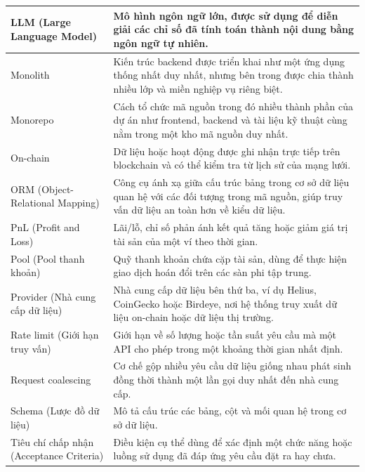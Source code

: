 \begin{longtable}{|L{3.8cm}|L{11.2cm}|}
LLM (Large Language Model) & Mô hình ngôn ngữ lớn, được sử dụng để diễn giải các chỉ số đã tính toán thành nội dung bằng ngôn ngữ tự nhiên. \\
\hline

Monolith & Kiến trúc backend được triển khai như một ứng dụng thống nhất duy nhất, nhưng bên trong được chia thành nhiều lớp và miền nghiệp vụ riêng biệt. \\
\hline

Monorepo & Cách tổ chức mã nguồn trong đó nhiều thành phần của dự án như frontend, backend và tài liệu kỹ thuật cùng nằm trong một kho mã nguồn duy nhất. \\
\hline

On-chain & Dữ liệu hoặc hoạt động được ghi nhận trực tiếp trên blockchain và có thể kiểm tra từ lịch sử của mạng lưới. \\
\hline

ORM (Object-Relational Mapping) & Công cụ ánh xạ giữa cấu trúc bảng trong cơ sở dữ liệu quan hệ với các đối tượng trong mã nguồn, giúp truy vấn dữ liệu an toàn hơn về kiểu dữ liệu. \\
\hline

PnL (Profit and Loss) & Lãi/lỗ, chỉ số phản ánh kết quả tăng hoặc giảm giá trị tài sản của một ví theo thời gian. \\
\hline

Pool (Pool thanh khoản) & Quỹ thanh khoản chứa cặp tài sản, dùng để thực hiện giao dịch hoán đổi trên các sàn phi tập trung. \\
\hline

Provider (Nhà cung cấp dữ liệu) & Nhà cung cấp dữ liệu bên thứ ba, ví dụ Helius, CoinGecko hoặc Birdeye, nơi hệ thống truy xuất dữ liệu on-chain hoặc dữ liệu thị trường. \\
\hline

Rate limit (Giới hạn truy vấn) & Giới hạn về số lượng hoặc tần suất yêu cầu mà một API cho phép trong một khoảng thời gian nhất định. \\
\hline

Request coalescing & Cơ chế gộp nhiều yêu cầu dữ liệu giống nhau phát sinh đồng thời thành một lần gọi duy nhất đến nhà cung cấp. \\
\hline

Schema (Lược đồ dữ liệu) & Mô tả cấu trúc các bảng, cột và mối quan hệ trong cơ sở dữ liệu. \\
\hline

Tiêu chí chấp nhận (Acceptance Criteria) & Điều kiện cụ thể dùng để xác định một chức năng hoặc luồng sử dụng đã đáp ứng yêu cầu đặt ra hay chưa. \\
\hline


\end{longtable}
